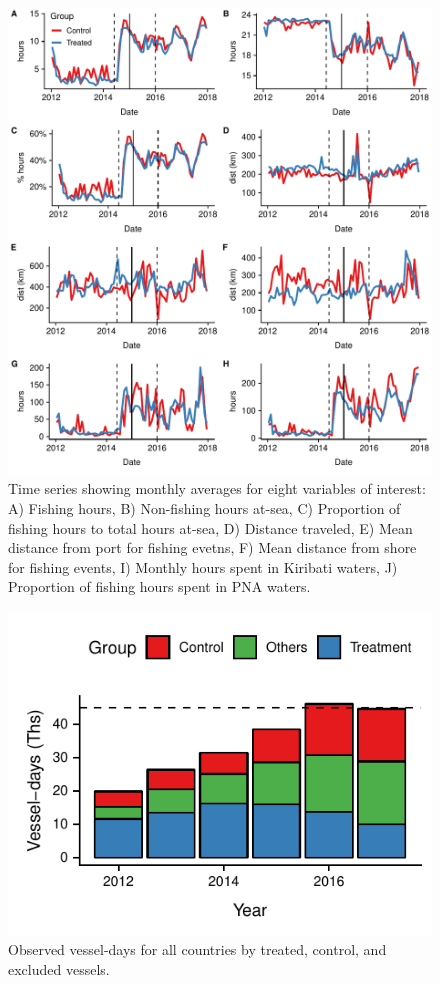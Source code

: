 \documentclass[9p,twocolumn,twoside,lineno]{pnas-new}
\begin{document}
\begin{figure}
\centering
\includegraphics{img/all_panels.pdf}
\caption{\label{fig:all_panels}Time series showing monthly averages for eight variables of interest: A) Fishing hours, B) Non-fishing hours at-sea, C) Proportion of fishing hours to total hours at-sea, D) Distance traveled, E) Mean distance from port for fishing evetns, F) Mean distance from shore for fishing events, I) Monthly hours spent in Kiribati waters, J) Proportion of fishing hours spent in PNA waters.}
\end{figure}

\clearpage

\begin{figure}
\centering
	\includegraphics{img/all_PS_VDS_year.pdf}
	\caption{\label{fig:all_PS_VDS_year}Observed vessel-days for all countries by treated, control, and excluded vessels.}
\end{figure}
\end{document}
